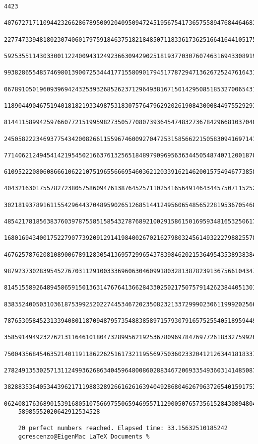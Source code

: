 \documentclass[11pt,twoside,openany]{memoir}
\begin{document}
\begin{tcolorbox}
\begin{Verbatim}[fontsize=\tiny]
    4423
    40767271711094423266286789500920409509472451956754173657558947684464681715260993357605734441071512726995067528
    22774733948180230740601797591846375182184850711833617362516641644105175190973383392151175207665399168925304543
    59253551143033001122400943124923663094290251819377030760746316943308919718040622906373244630633700074441656766
    99382865548574698013900725344417715580901794517787294713626725247616431165717354475083506329812661542345174259
    06789105019609396942432539326852623712964938167150142950851853270065431913565868853782243217352557806761951338
    11890449046751940181821933498753183075764796292026190843000844975529291305664590166644363230635189733962082641
    81441158994259766077215199598273505770807393645474832736784296681037040447804670653738245607704296033370069548
    24505822234693775434200826611559674600927047253158566221505830941697141245012037314920039130513962639114775849
    77140621249454142195450216637613256518489790969563634450548740712001870040983342421713138666432797831217092241
    61095222080608666106221075196556669546036212033916214620015754946773858930331944632744676736422424630471770419
    40432163017557827238057586094761387645257110254165649146434457507115252105707359673112338456098641211772828674
    30218193789161155429644370489590265126851441249560654856522819536705468817797360978941740764538971649632354148
    48542178185638376039787558515854327876892100291586150169593481653250617283841617035992495539326209286081463451
    16801694340017522790773920912914198400267021627980324561493222798825578534737322092426974884785267057474816334
    46762578762081089006789128305413695729965437839846202153649543538938384648886726714533931309276721032688495972
    98792373028395452767031129100333696063046099180328138782391367566104347713165495897021159454503241952055937183
    81451558926489458659150136314767641366284330250217507579142623844051301540547600747649874778320189210620558469
    83835240050310361875399252022744534672023508232133729990230611999202566891988999088179446106952818866466308246
    78765305845231339408011870948795735488385897157930791657525540518959449984465130248721166519809265271872913736
    35859149492327621311646101804732899562192536780969784769772618332759926565052744612980062971892140437562793073
    75004356845463521401191186226251617321195569750360233204121263441818337545713778677475837837581743179570110000
    27824913530257131124993626863404596480086028834672069335493603141485087204213357254720762673897857837928958409
    38288353640534439621711988328926616261639404928680462679637265401591753564543019805375186717496191299114752538
    06240817636890153916805107566975506594695571129005076573561528430894804850792851608327362749801232434269246305
    58985552020642912534528
    
    20 perfect numbers reached. Elapsed time: 33.15632510185242
    gcrescenzo@EigenMac LaTeX Documents % 
\end{Verbatim}
\end{tcolorbox}
    
\end{document}
